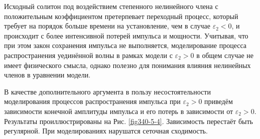 \documentclass[14pt,a4paper]{extreport}
\begin{document}
			Исходный солитон под воздействием степенного нелинейного члена с положительным коэффициентом претерпевает переходный процесс, который требует на порядок больше времени на установление, чем в случае \(\varepsilon_{2}<0\), и происходит с более интенсивной потерей импульса и мощности. Учитывая, что при этом закон сохранения импульса не выполняется, моделирование процесса распространения уединённой волны в рамках модели с \(\varepsilon_{2}>0\) в общем случае не имеет физического смысла, однако полезно для понимания влияния нелинейных членов в уравнении модели.

			В качестве дополнительного аргумента в пользу несостоятельности моделирования процессов распространения импульса при \(\varepsilon_{2}>0\) приведём зависимости конечной амплитуды импульса и его потерь в зависимости от \(\varepsilon_{2}>0\). Результаты проиллюстрированы на Рис. \ref{fig340-5-4}. Зависимость перестаёт быть регулярной. При моделированиях нарушатся сеточная сходимость.
\end{document}
